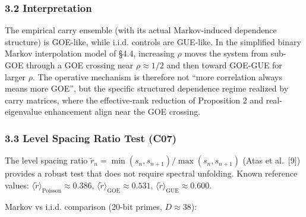 \documentclass[
  11pt,
]{article}
\begin{document}
\subsubsection{3.2 Interpretation}\label{interpretation}

The empirical carry ensemble (with its actual Markov-induced dependence
structure) is GOE-like, while i.i.d. controls are GUE-like. In the simplified
binary Markov interpolation model of §4.4, increasing \(\rho\) moves the system
from sub-GOE through a GOE crossing near \(\rho \approx 1/2\) and then toward
GOE-GUE for larger \(\rho\). The operative mechanism is therefore not ``more
correlation always means more GOE'', but the specific structured dependence
regime realized by carry matrices, where the effective-rank reduction of
Proposition 2 and real-eigenvalue enhancement align near the GOE crossing.

\subsubsection{3.3 Level Spacing Ratio Test
(C07)}\label{level-spacing-ratio-test-c07}

The level spacing ratio \(\tilde{r}_n = \min(s_n, s_{n+1})/\max(s_n, s_{n+1})\)
(Atas et al.~{[}9{]}) provides a robust test that does not require spectral
unfolding. Known reference values:
\(\langle\tilde{r}\rangle_{\text{Poisson}} \approx 0.386\),
\(\langle\tilde{r}\rangle_{\text{GOE}} \approx 0.531\),
\(\langle\tilde{r}\rangle_{\text{GUE}} \approx 0.600\).

Markov vs i.i.d. comparison (20-bit primes, \(D \approx 38\)):
\end{document}
